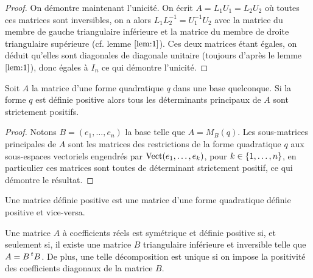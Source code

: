 \begin{proof}
On démontre maintenant l'unicité. On écrit $A = L_1 U_1 = L_2 U_2$ où toutes ces matrices sont inversibles, on a alors
$L_1 L_2^{-1} = U_1^{-1} U_2$ avec la matrice du membre de gauche triangulaire inférieure et la matrice du membre de droite 
triangulaire supérieure (cf. lemme $\ref{lem:1}$).
Ces deux matrices étant égales, on déduit qu'elles sont diagonales de diagonale unitaire (toujours d'après le lemme $\ref{lem:1}$),
donc égales à $I_n$ ce qui démontre l'unicité.
\end{proof}

\begin{lem}
\label{lem:3}
Soit $A$ la matrice d'une forme quadratique $q$ dans une base quelconque. 
Si la forme $q$ est définie positive alors tous les déterminants principaux de $A$ sont strictement positifs.
\end{lem}

\begin{proof}
Notons $B=(e_1, \dots, e_n)$ la base telle que $A=M_B(q)$. 
Les sous-matrices principales de $A$ sont les matrices des restrictions de la forme quadratique $q$ aux sous-espaces vectoriels
engendrés par $\operatorname{Vect}(e_1, \dots, e_k)$, pour $k \in \{ 1, \dots, n \}$, en particulier ces matrices sont toutes de déterminant 
strictement positif, ce qui démontre le résultat.
\end{proof}

\begin{rmq}
Une matrice définie positive est une matrice d'une forme quadratique définie positive et vice-versa.
\end{rmq}

\begin{thm}[Cholesky]
Une matrice $A$ à coefficients réels est symétrique et définie positive si, et seulement si, il existe une matrice $B$ triangulaire inférieure
et inversible telle que $A =B\prescript{t}{}{B}$. De plus, une telle décomposition est unique si on impose la positivité des coefficients diagonaux
de la matrice $B$. 
\end{thm}

